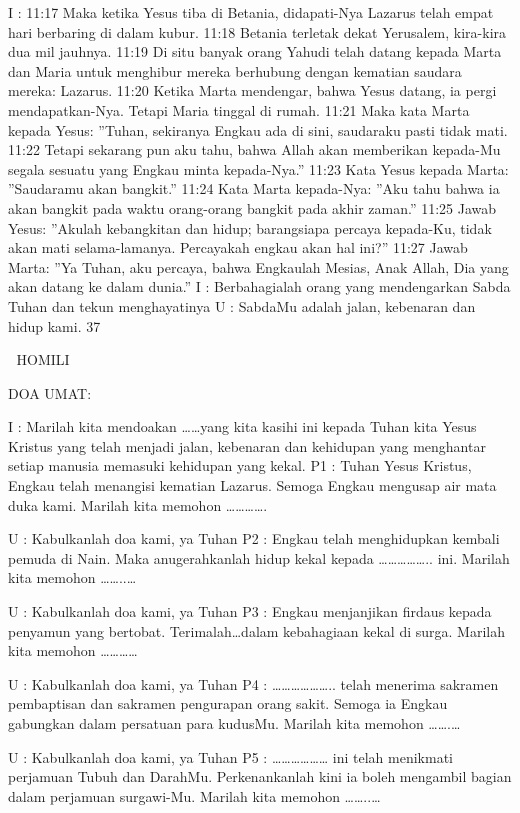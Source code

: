 \documentclass[10pt,a5paper,fancyhdr]{memoir}
\begin{document}
I : 11:17 Maka ketika Yesus tiba di Betania, didapati-Nya Lazarus 
telah empat hari berbaring di dalam kubur. 11:18 Betania terletak 
dekat Yerusalem, kira-kira dua mil jauhnya. 11:19 Di situ banyak 
orang Yahudi telah datang kepada Marta dan Maria untuk menghibur 
mereka berhubung dengan kematian saudara mereka: Lazarus. 11:20 
Ketika Marta mendengar, bahwa Yesus datang, ia pergi 
mendapatkan-Nya. Tetapi Maria tinggal di rumah. 11:21 Maka kata 
Marta kepada Yesus: ”Tuhan, sekiranya Engkau ada di sini, 
saudaraku pasti tidak mati. 11:22 Tetapi sekarang pun aku tahu, 
bahwa Allah akan memberikan kepada-Mu segala sesuatu yang 
Engkau minta kepada-Nya.” 11:23 Kata Yesus kepada Marta: 
”Saudaramu akan bangkit.” 11:24 Kata Marta kepada-Nya: ”Aku 
tahu bahwa ia akan bangkit pada waktu orang-orang bangkit pada 
akhir zaman.” 11:25 Jawab Yesus: ”Akulah kebangkitan dan hidup; 
barangsiapa percaya kepada-Ku, tidak akan mati selama-lamanya. 
Percayakah engkau akan hal ini?” 11:27 Jawab Marta: ”Ya Tuhan, 
aku percaya, bahwa Engkaulah Mesias, Anak Allah, Dia yang akan 
datang ke dalam dunia.” 
I : Berbahagialah orang yang mendengarkan Sabda Tuhan dan tekun 
menghayatinya 
U : SabdaMu adalah jalan, kebenaran dan hidup kami. 
37 



HOMILI 

DOA UMAT: 

I : Marilah kita mendoakan ……yang kita kasihi ini kepada Tuhan 
kita Yesus Kristus yang telah menjadi jalan, kebenaran dan 
kehidupan yang menghantar setiap manusia memasuki kehidupan 
yang kekal. 
P1 : Tuhan Yesus Kristus, Engkau telah menangisi kematian Lazarus. 
Semoga Engkau mengusap air mata duka kami. Marilah kita 
memohon …………. 

U : Kabulkanlah doa kami, ya Tuhan 
P2 : Engkau telah menghidupkan kembali pemuda di Nain. Maka 
anugerahkanlah hidup kekal kepada …………….. ini. Marilah kita 
memohon ……..… 

U : Kabulkanlah doa kami, ya Tuhan 
P3 : Engkau menjanjikan firdaus kepada penyamun yang bertobat. 
Terimalah…dalam kebahagiaan kekal di surga. Marilah kita 
memohon ………… 

U : Kabulkanlah doa kami, ya Tuhan 
P4 : ……………….. telah menerima sakramen pembaptisan dan 
sakramen pengurapan orang sakit. Semoga ia Engkau gabungkan 
dalam persatuan para kudusMu. Marilah kita memohon …….… 

U : Kabulkanlah doa kami, ya Tuhan 
P5 : ……………… ini telah menikmati perjamuan Tubuh dan 
DarahMu. Perkenankanlah kini ia boleh mengambil bagian dalam 
perjamuan surgawi-Mu. Marilah kita memohon ……..… 
\end{document}
